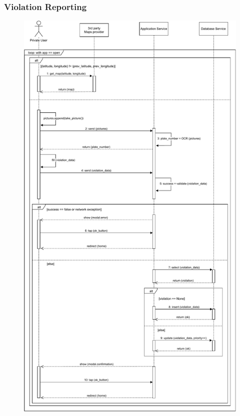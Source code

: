 \documentclass[12pt,a4paper]{article}
\begin{document}
\subsubsection{Violation Reporting}
\begin{figure}[H]
				\centering
				\includegraphics[width=1\textwidth,height=0.9\textheight,keepaspectratio]{assets/sequence_diagrams/exports/workflow_private_subject.pdf}
				\label{fig:workflow1_sequence}
			\end{figure}
\end{document}
